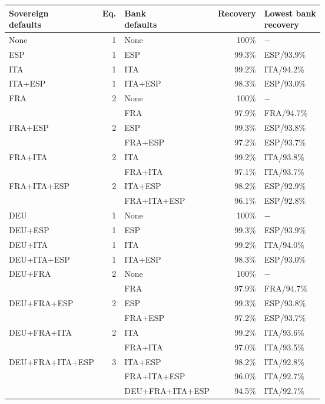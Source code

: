 \begin{tabular*}{\textwidth}{@{\extracolsep{\fill}}lrlrl@{}}
\toprule
\shortstack[l]{Sovereign\\defaults} & Eq. & \shortstack[l]{Bank\\defaults} & Recovery & \shortstack[l]{Lowest bank\\recovery} \\
\midrule
None & 1 & None & 100\% & $-$ \\
\midrule
ESP & 1 & ESP & 99.3\% & ESP/93.9\% \\
\midrule
ITA & 1 & ITA & 99.2\% & ITA/94.2\% \\
\midrule
ITA+ESP & 1 & ITA+ESP & 98.3\% & ESP/93.0\% \\
\midrule
\multirow{2}{*}{FRA} & \multirow{2}{*}{2} & None & 100\% & $-$ \\
 &  & FRA & 97.9\% & FRA/94.7\% \\
\midrule
\multirow{2}{*}{FRA+ESP} & \multirow{2}{*}{2} & ESP & 99.3\% & ESP/93.8\% \\
 &  & FRA+ESP & 97.2\% & ESP/93.7\% \\
\midrule
\multirow{2}{*}{FRA+ITA} & \multirow{2}{*}{2} & ITA & 99.2\% & ITA/93.8\% \\
 &  & FRA+ITA & 97.1\% & ITA/93.7\% \\
\midrule
\multirow{2}{*}{FRA+ITA+ESP} & \multirow{2}{*}{2} & ITA+ESP & 98.2\% & ESP/92.9\% \\
 &  & FRA+ITA+ESP & 96.1\% & ESP/92.8\% \\
\midrule
DEU & 1 & None & 100\% & $-$ \\
\midrule
DEU+ESP & 1 & ESP & 99.3\% & ESP/93.9\% \\
\midrule
DEU+ITA & 1 & ITA & 99.2\% & ITA/94.0\% \\
\midrule
DEU+ITA+ESP & 1 & ITA+ESP & 98.3\% & ESP/93.0\% \\
\midrule
\multirow{2}{*}{DEU+FRA} & \multirow{2}{*}{2} & None & 100\% & $-$ \\
 &  & FRA & 97.9\% & FRA/94.7\% \\
\midrule
\multirow{2}{*}{DEU+FRA+ESP} & \multirow{2}{*}{2} & ESP & 99.3\% & ESP/93.8\% \\
 &  & FRA+ESP & 97.2\% & ESP/93.7\% \\
\midrule
\multirow{2}{*}{DEU+FRA+ITA} & \multirow{2}{*}{2} & ITA & 99.2\% & ITA/93.6\% \\
 &  & FRA+ITA & 97.0\% & ITA/93.5\% \\
\midrule
\multirow{3}{*}{DEU+FRA+ITA+ESP} & \multirow{3}{*}{3} & ITA+ESP & 98.2\% & ITA/92.8\% \\
 &  & FRA+ITA+ESP & 96.0\% & ITA/92.7\% \\
 &  & DEU+FRA+ITA+ESP & 94.5\% & ITA/92.7\% \\
\bottomrule
\end{tabular*}
